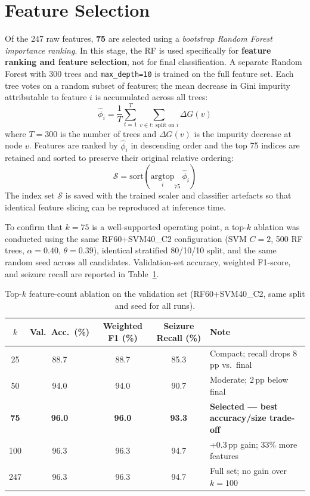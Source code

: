 \documentclass[12pt, a4paper]{report}
\begin{document}
\section{Feature Selection}
\label{sec:selection}

Of the 247 raw features, \textbf{75} are selected using a
\textit{bootstrap Random Forest importance ranking}. In this stage, the
RF is used specifically for \textbf{feature ranking and feature selection},
not for final classification. A separate Random Forest with 300 trees and
\texttt{max\_depth=10} is trained on the full feature set. Each tree votes
on a random subset of features; the mean
decrease in Gini impurity attributable to feature $i$ is accumulated
across all trees:
\begin{equation}
  \hat{\phi}_i =
  \frac{1}{T}\sum_{t=1}^{T}\sum_{v\in t:\,\text{split on }i}
  \Delta G(v)
  \label{eq:rfimportance}
\end{equation}
where $T=300$ is the number of trees and $\Delta G(v)$ is the impurity
decrease at node $v$. Features are ranked by $\hat{\phi}_i$ in descending
order and the top 75 indices are retained and sorted to preserve their
original relative ordering:
\begin{equation}
  \mathcal{S} = \text{sort}\!\left(\underset{i}{\mathrm{argtop}}_{75}\,\hat{\phi}_i\right)
  \label{eq:topk}
\end{equation}
The index set $\mathcal{S}$ is saved with the trained scaler and classifier
artefacts so that identical feature slicing can be reproduced at inference
time.

To confirm that $k=75$ is a well-supported operating point, a top-$k$
ablation was conducted using the same RF60+SVM40\_C2 configuration
(SVM $C=2$, 500 RF trees, $\alpha=0.40$, $\theta=0.39$), identical
stratified 80/10/10 split, and the same random seed across all
candidates.  Validation-set accuracy, weighted F1-score, and seizure
recall are reported in Table~\ref{tab:feature_ablation}.

\begin{table}[H]
  \centering
  \caption{Top-$k$ feature-count ablation on the validation set
           (RF60+SVM40\_C2, same split and seed for all runs).}
  \label{tab:feature_ablation}
  \footnotesize
  \renewcommand{\arraystretch}{1.18}
  \begin{tabular}{ccccl}
    \toprule
    \textbf{$k$} & \textbf{Val.\ Acc.\ (\%)} & \textbf{Weighted F1 (\%)} &
    \textbf{Seizure Recall (\%)} & \textbf{Note} \\
    \midrule
    25  & 88.7 & 88.7 & 85.3 & Compact; recall drops 8\,pp vs.\ final \\
    50  & 94.0 & 94.0 & 90.7 & Moderate; 2\,pp below final \\
    \textbf{75}  & \textbf{96.0} & \textbf{96.0} & \textbf{93.3} &
      \textbf{Selected — best accuracy/size trade-off} \\
    100 & 96.3 & 96.3 & 94.7 & +0.3\,pp gain; 33\% more features \\
    247 & 96.3 & 96.3 & 94.7 & Full set; no gain over $k=100$ \\
    \bottomrule
  \end{tabular}
\end{table}
\end{document}
